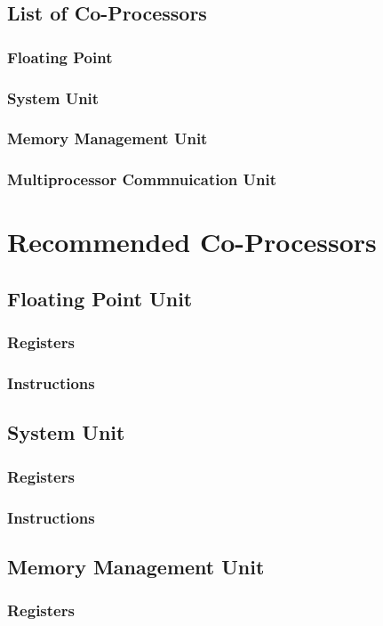 \documentclass[letterpaper, 11pt]{article}
\begin{document}
\subsection{List of Co-Processors}
\subsubsection{Floating Point}
\subsubsection{System Unit}
\subsubsection{Memory Management Unit}
\subsubsection{Multiprocessor Commnuication Unit}

\section{Recommended Co-Processors}
\subsection{Floating Point Unit}
\subsubsection{Registers}
\subsubsection{Instructions}
\subsection{System Unit}
\subsubsection{Registers}
\subsubsection{Instructions}
\subsection{Memory Management Unit}
\subsubsection{Registers}
\end{document}
